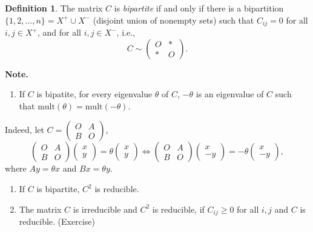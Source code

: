 \documentclass[
]{book}
\providecommand{\tightlist}{%
  \setlength{\itemsep}{0pt}\setlength{\parskip}{0pt}}
\theoremstyle{definition}
\newtheorem{definition}{Definition}[chapter]
\theoremstyle{definition}
\theoremstyle{definition}
\theoremstyle{definition}
\theoremstyle{remark}
\begin{document}
\begin{definition}
The matrix \(C\) is \emph{bipartite} if and only if there is a bipartition \(\{1, 2, \ldots, n\} = X^+ \cup X^-\) (disjoint union of nonempty sets) such that \(C_{ij} = 0\) for all \(i,j\in X^+\), and for all \(i,j\in X^-\), i.e.,
\[ C \sim \begin{pmatrix} O & \ast \\ \ast  & O \end{pmatrix}.\]
\end{definition}

\textbf{Note.}

\begin{enumerate}
\def\labelenumi{\arabic{enumi}.}
\tightlist
\item
  If \(C\) is bipatite, for every eigenvalue \(\theta\) of \(C\), \(-\theta\) is an eigenvalue of \(C\) such that \(\mathrm{mult}(\theta) = \mathrm{mult}(-\theta)\).
\end{enumerate}

Indeed, let \(C = \begin{pmatrix} O & A \\ B & O \end{pmatrix}\),
\[\begin{pmatrix} O & A \\ B & O \end{pmatrix} \begin{pmatrix}x\\y\end{pmatrix} = \theta \begin{pmatrix}x\\y\end{pmatrix}\Leftrightarrow \begin{pmatrix} O & A \\ B & O \end{pmatrix} \begin{pmatrix}x\\-y\end{pmatrix} = -\theta \begin{pmatrix}x\\-y\end{pmatrix}, \]
where \(Ay = \theta x\) and \(Bx = \theta y\).

\begin{enumerate}
\def\labelenumi{\arabic{enumi}.}
\setcounter{enumi}{1}
\item
  If \(C\) is bipartite, \(C^2\) is reducible.
\item
  The matrix \(C\) is irreducible and \(C^2\) is reducible, if \(C_{ij} \geq 0\) for all \(i,j\) and \(C\) is reducible. (Exercise)
\end{enumerate}
\end{document}
